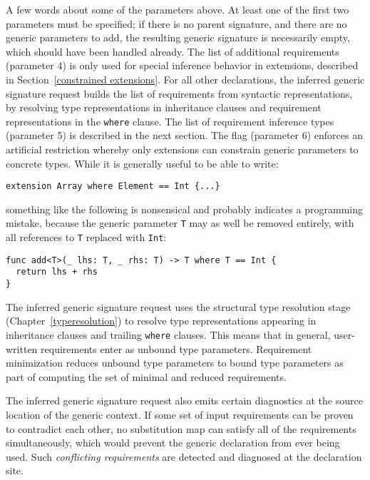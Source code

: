 \documentclass[a4paper,headsepline,bibliography=totoc,toc=flat,fleqn,twoside=semi]{scrbook}
\theoremstyle{definition}
\theoremstyle{definition}
\theoremstyle{definition}
\begin{document}
A few words about some of the parameters above. At least one of the first two parameters must be specified; if there is no parent signature, and there are no generic parameters to add, the resulting generic signature is necessarily empty, which should have been handled already. The list of additional requirements (parameter 4) is only used for special inference behavior in extensions, described in Section~\ref{constrained extensions}. For all other declarations, the inferred generic signature request builds the list of requirements from syntactic representations, by resolving type representations in inheritance clauses and requirement representations in the \texttt{where} clause. The list of requirement inference types (parameter 5) is described in the next section. The flag (parameter 6) enforces an artificial restriction whereby only extensions can constrain generic parameters to concrete types. While it is generally useful to be able to write:
\begin{Verbatim}
extension Array where Element == Int {...}
\end{Verbatim}
something like the following is nonsensical and probably indicates a programming mistake, because the generic parameter \texttt{T} may as well be removed entirely, with all references to \texttt{T} replaced with \texttt{Int}:
\begin{Verbatim}
func add<T>(_ lhs: T, _ rhs: T) -> T where T == Int {
  return lhs + rhs
}
\end{Verbatim}

The inferred generic signature request uses the structural type resolution stage (Chapter~\ref{typeresolution}) to resolve type representations appearing in inheritance clauses and trailing \texttt{where} clauses. This means that in general, user-written requirements enter as unbound type parameters. Requirement minimization reduces unbound type parameters to bound type parameters as part of computing the set of minimal and reduced requirements.

The inferred generic signature request also emits certain diagnostics at the source location of the generic context. If some set of input requirements can be proven to contradict each other, no substitution map can satisfy all of the requirements simultaneously, which would prevent the generic declaration from ever being used. Such \emph{conflicting requirements} are detected and diagnosed at the declaration site.
\end{document}
